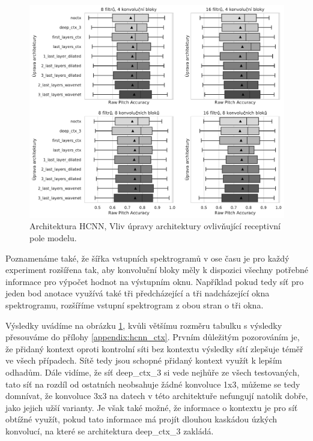 \begin{figure}[h]\centering
    \includegraphics[width=\textwidth,height=\textheight,keepaspectratio]{../img/figures/spectrogram_ctx_archs_grey}
\caption{Architektura HCNN, Vliv úpravy architektury ovlivňující receptivní pole modelu.}\label{obr:spectrogram_ctx_archs}
\end{figure}

Poznamenáme také, že šířka vstupních spektrogramů v ose času je pro každý experiment rozšířena tak, aby konvoluční bloky měly k dispozici všechny potřebné informace pro výpočet hodnot na výstupním oknu. Například pokud tedy síť pro jeden bod anotace využívá také tři předcházející a tři nadcházející okna spektrogramu, rozšíříme vstupní spektrogram z obou stran o tři okna.


Výsledky uvádíme na obrázku \ref{obr:spectrogram_ctx_archs}, kvůli většímu rozměru tabulku s výsledky přesouváme do přílohy \ref{appendix:hcnn_ctx}. Prvním důležitým pozorováním je, že přidaný kontext oproti kontrolní síti bez kontextu výsledky sítí zlepšuje téměř ve všech případech. Sítě tedy jsou schopné přidaný kontext využít k lepším odhadům. Dále vidíme, že síť deep\_ctx\_3 si vede nejhůře ze všech testovaných, tato síť na rozdíl od ostatních neobsahuje žádné konvoluce 1x3, můžeme se tedy domnívat, že konvoluce 3x3 na datech v této architektuře nefungují natolik dobře, jako jejich užší varianty. Je však také možné, že informace o kontextu je pro síť obtížné využít, pokud tato informace má projít dlouhou kaskádou úzkých konvolucí, na které se architektura deep\_ctx\_3 zakládá.

